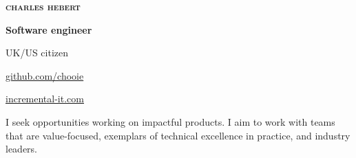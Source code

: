 \begin{center}
  \begin{lsstyle}
    {\Huge \scshape \bfseries charles hebert}
  \end{lsstyle}

  \vspace*{0.5em}

  \textbf{Software engineer}

  UK/US citizen
\end{center}

\begin{small}

\noindent
\begin{minipage}[t]{0.5\textwidth}
\end{minipage}
\noindent
\noindent
\begin{minipage}[t]{0.5\textwidth}
  \begin{description}
    \raggedleft
    \item[My code] \href{http://www.github.com/chooie}{github.com/chooie}
    \item[Website]
      \href{http://incremental-it.com}{incremental-it.com}
  \end{description}
\end{minipage}
\noindent

\end{small}

\vspace*{1em}
\begin{center}
  I seek opportunities working on impactful products. I aim to work with teams
  that are value-focused, exemplars of technical excellence in practice, and
  industry leaders.
\end{center}

